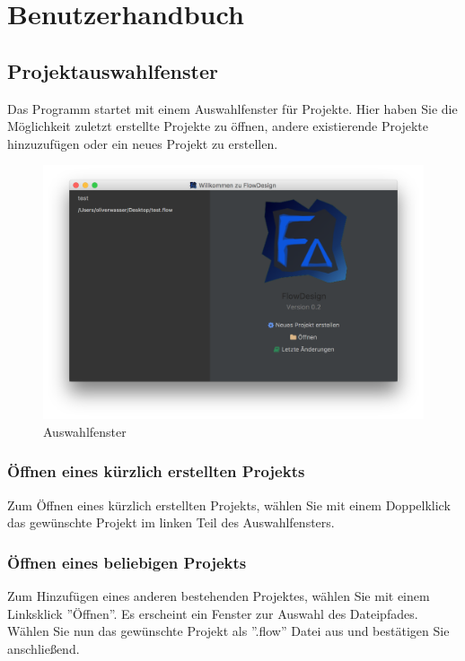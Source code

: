 
\section{Benutzerhandbuch}

\subsection{Projektauswahlfenster}
Das Programm startet mit einem Auswahlfenster für Projekte. Hier haben Sie die Möglichkeit zuletzt erstellte Projekte zu öffnen, andere existierende Projekte hinzuzufügen oder ein neues Projekt zu erstellen. 

\begin{figure}[h!]
	\centering
	\includegraphics[width=1.0\textwidth]{Auswahlfenster.png}
	\caption{Auswahlfenster}
\end{figure}


\subsubsection{Öffnen eines kürzlich erstellten Projekts}
Zum Öffnen eines kürzlich erstellten Projekts, wählen Sie mit einem Doppelklick das gewünschte Projekt im linken Teil des Auswahlfensters.

\subsubsection{Öffnen eines beliebigen Projekts}
Zum Hinzufügen eines anderen bestehenden Projektes, wählen Sie mit einem Linksklick ''Öffnen''. Es erscheint ein Fenster zur Auswahl des Dateipfades. Wählen Sie nun das gewünschte Projekt als ''.flow'' Datei aus und bestätigen Sie anschließend.

